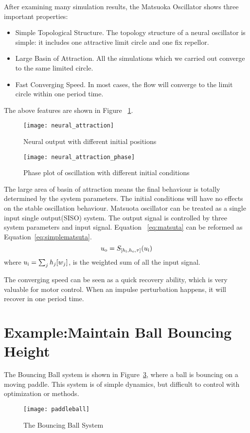 After examining many simulation results, the Matsuoka Oscillator shows three important properties:
\begin{itemize}
\item{Simple Topological Structure.}
The topology structure of a neural oscillator is simple: 
it includes one  attractive limit circle and one fix repellor.
\item{Large Basin of Attraction.}
All the simulations which we carried out converge to the same limited circle.
\item{Fast Converging Speed.}
In most  cases, the flow will converge to the limit circle within one period time.
\end{itemize}


The above features are shown in Figure ~\ref{fig:time_timeAttraction}.
\begin{figure}
\begin{center}
\texttt{[image: neural\_attraction]}
\end{center}
\caption{Neural output with different initial positions}
\label{fig:time_timeAttraction}
\end{figure}

\begin{figure}
\begin{center}
\texttt{[image: neural\_attraction\_phase]}
\end{center}
\caption{Phase plot of oscillation with different initial conditions}
\label{fig:phase_attraction}
\end{figure}
 
The large area of basin of attraction means the final behaviour is totally determined by the system parameters. 
The initial conditions will have no effects on the stable oscillation behaviour. 
Matsuota oscillator can be treated as a single input single output(SISO) system.
The output signal is controlled by three system parameters and input signal. 
Equation ~\ref{eq:matsuta} can be reformed as Equation~\ref{eq:simplematsuta}.
\begin{equation}
u_{\mathrm{o}}=S_{[h_{\mathrm{i}},h_{\mathrm{o}},\tau]}(u_{\mathrm{i}})
\label{eq:simplematsuta}
\end{equation}
where $u_{\mathrm{i}}=\sum_{j}h_{j}[w_{j}]$, is the weighted sum of all the input signal.

The converging speed can be seen as a quick recovery ability, which is very valuable for motor control.
When an impulse perturbation happens, it will recover in one period time.


\section{Example:Maintain Ball Bouncing Height}
\label{sec:qualyexample}
The Bouncing Ball system is shown in Figure~\ref{fig:bball}, where a ball is bouncing on a moving paddle.
This system is of simple dynamics, but difficult to control with optimization or \pd methods.
\begin{figure}
\begin{center}
\texttt{[image: paddleball]}
\end{center}
\caption{The Bouncing Ball System}
\label{fig:bball}
\end{figure}
 
